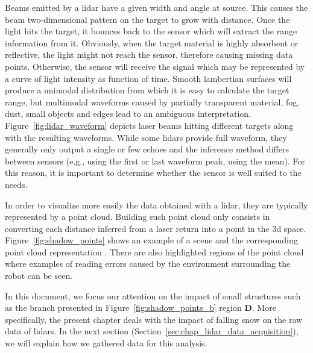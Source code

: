 Beams emitted by a \gls*{lidar} have a given width and angle at source. This causes the beam two-dimensional pattern on the target to grow with distance. Once the light hits the target, it bounces back to the sensor which will extract the range information from it. Obviously, when the target material is highly absorbent or reflective, the light might not reach the sensor, therefore causing missing data points. Otherwise, the sensor will receive the signal which may be represented by a curve of light intensity as function of time. Smooth lambertian surfaces will produce a unimodal distribution from which it is easy to calculate the target range, but multimodal waveforms caused by partially transparent material, fog, dust, small objects and edges lead to an ambiguous interpretation. Figure~\ref{fig:lidar_waveform} depicts laser beams hitting different targets along with the resulting waveforms. While some \gls*{lidar}s provide full waveform, they generally only output a single or few echoes and the inference method differs between sensors (e.g., using the first or last waveform peak, using the mean). For this reason, it is important to determine whether the sensor is well suited to the needs. 

In order to visualize more easily the data obtained with a lidar, they are typically represented by a point cloud. Building such point cloud only consists in converting each distance inferred from a laser return into a point in the \gls*{3d} space. Figure~\ref{fig:shadow_points} shows an example of a scene  and the corresponding point cloud representation . There are also highlighted regions of the point cloud where examples of reading errors caused by the environment surrounding the robot can be seen. 

In this document, we focus our attention on the impact of small structures such as the branch presented in Figure~\ref{fig:shadow_points_b} region \textbf{D}. More specifically, the present chapter deals with the impact of falling snow on the raw data of \gls*{lidar}s. In the next section (Section~\ref{sec:chap_lidar_data_acquisition}), we will explain how we gathered data for this analysis.

